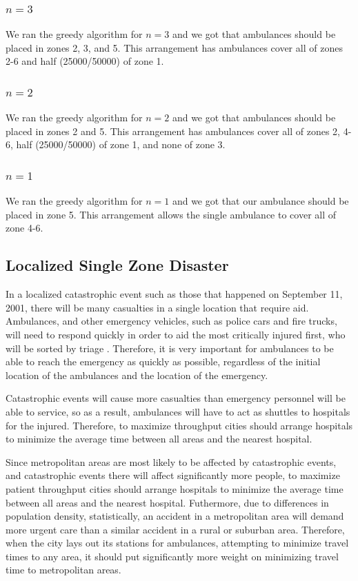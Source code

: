 \documentclass[notitlepage, 12pt]{article}
\begin{document}
\subsubsection{$n=3$}
We ran the greedy algorithm for $n=3$ and we got that ambulances should be placed in zones
2, 3, and 5. This arrangement has ambulances cover all of zones 2-6 and half (25000/50000) of
zone 1.

\subsubsection{$n=2$}
We ran the greedy algorithm for $n=2$ and we got that ambulances should be placed in zones
2 and 5. This arrangement has ambulances cover all of zones 2, 4-6, half (25000/50000) of
zone 1, and none of zone 3.

\subsubsection{$n=1$}
We ran the greedy algorithm for $n=1$ and we got that our ambulance should be placed in zone 5. This arrangement allows the single ambulance to cover all of zone 4-6.

\subsection{Localized Single Zone Disaster}
In a localized catastrophic event such as those that happened on September 11, 2001, there will be
many casualties in a single location that require aid. Ambulances, and other emergency vehicles,
such as police cars and fire trucks, will need to respond quickly in order to aid the most critically
injured first, who will be sorted by triage \cite{ColRev}. Therefore, it is very important for ambulances to be able to
reach the emergency as quickly as possible, regardless of the initial location of the ambulances and the
location of the emergency.

Catastrophic events will cause more casualties than emergency personnel will be able to service, so as a result,
ambulances will have to act as shuttles to hospitals for the injured. Therefore, to maximize throughput
cities should arrange hospitals to minimize the average time between all areas and the nearest
hospital.

Since metropolitan areas are most likely to be affected by catastrophic events, and catastrophic events there
will affect significantly more people, to maximize patient throughput cities should arrange hospitals to minimize
the average time between all areas and the nearest hospital. Futhermore, due to differences in population density,
statistically, an accident in a metropolitan area will demand more urgent care than a similar accident
in a rural or suburban area. Therefore, when the city lays out its stations for ambulances, attempting to minimize
travel times to any area, it should put significantly more weight on minimizing travel time to metropolitan areas.
\end{document}
